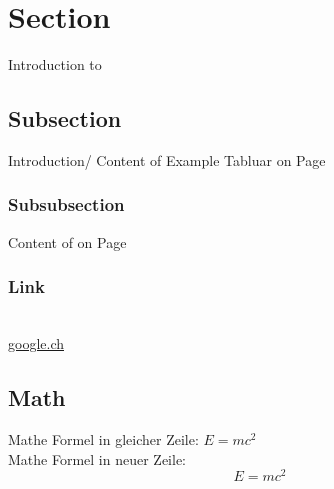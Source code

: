 

\section{Section}
\label{sec:Section}
Introduction to 

\subsection{Subsection}
\label{subsec:subsection}
Introduction/ Content of 
Example Tabluar on Page \pageref{tab:example tabular}

\subsubsection{Subsubsection}
\label{subsubsec:subsubsection}
Content of  on Page \pageref{sec:Section}

\subsubsection{Link}
 \\
\href{www.google.ch}{google.ch} %

\subsection{Math}

Mathe Formel in gleicher Zeile: $E=mc^2$\\

Mathe Formel in neuer Zeile: $$E=mc^2$$
